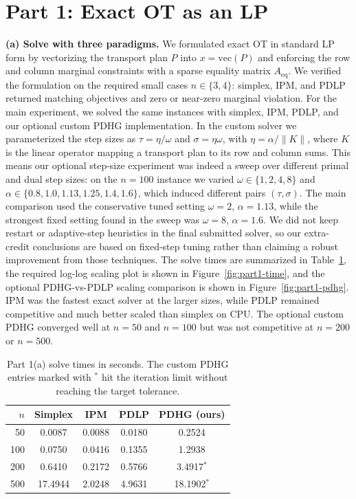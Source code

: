 \documentclass[10pt]{article}
\begin{document}
\section*{Part 1: Exact OT as an LP}
\textbf{(a) Solve with three paradigms.} We formulated exact OT in standard LP form by vectorizing the transport plan $P$ into $x=\mathrm{vec}(P)$ and enforcing the row and column marginal constraints with a sparse equality matrix $A_{\mathrm{eq}}$. We verified the formulation on the required small cases $n\in\{3,4\}$: simplex, IPM, and PDLP returned matching objectives and zero or near-zero marginal violation. For the main experiment, we solved the same instances with simplex, IPM, PDLP, and our optional custom PDHG implementation. In the custom solver we parameterized the step sizes as $\tau=\eta/\omega$ and $\sigma=\eta\omega$, with $\eta=\alpha/\|K\|$, where $K$ is the linear operator mapping a transport plan to its row and column sums. This means our optional step-size experiment was indeed a sweep over different primal and dual step sizes: on the $n=100$ instance we varied $\omega\in\{1,2,4,8\}$ and $\alpha\in\{0.8,1.0,1.13,1.25,1.4,1.6\}$, which induced different pairs $(\tau,\sigma)$. The main comparison used the conservative tuned setting $\omega=2$, $\alpha=1.13$, while the strongest fixed setting found in the sweep was $\omega=8$, $\alpha=1.6$. We did not keep restart or adaptive-step heuristics in the final submitted solver, so our extra-credit conclusions are based on fixed-step tuning rather than claiming a robust improvement from those techniques. The solve times are summarized in Table~\ref{tab:part1a-time}, the required log-log scaling plot is shown in Figure~\ref{fig:part1-time}, and the optional PDHG-vs-PDLP scaling comparison is shown in Figure~\ref{fig:part1-pdhg}. IPM was the fastest exact solver at the larger sizes, while PDLP remained competitive and much better scaled than simplex on CPU. The optional custom PDHG converged well at $n=50$ and $n=100$ but was not competitive at $n=200$ or $n=500$.

\begin{table}[H]
\centering
\scriptsize
\begin{tabular}{rcccc}
\toprule
$n$ & Simplex & IPM & PDLP & PDHG (ours) \\
\midrule
50  & 0.0087 & 0.0088 & 0.0180 & 0.2524 \\
100 & 0.0750 & 0.0416 & 0.1355 & 1.2938 \\
200 & 0.6410 & 0.2172 & 0.5766 & 3.4917$^\ast$ \\
500 & 17.4944 & 2.0248 & 4.9631 & 18.1902$^\ast$ \\
\bottomrule
\end{tabular}
\caption{Part 1(a) solve times in seconds. The custom PDHG entries marked with $^\ast$ hit the iteration limit without reaching the target tolerance.}
\label{tab:part1a-time}
\end{table}
\end{document}
